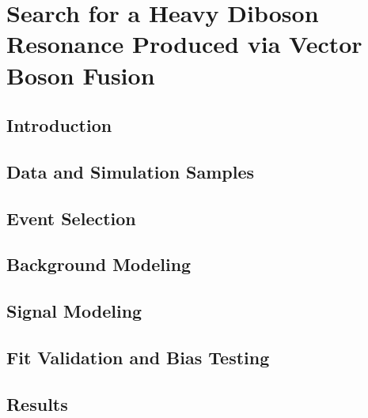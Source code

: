 
\chapter{Search for a Heavy Diboson Resonance Produced via Vector Boson Fusion}

\section{Introduction}

\section{Data and Simulation Samples}

\section{Event Selection}

\section{Background Modeling}

\section{Signal Modeling}

\section{Fit Validation and Bias Testing}

\section{Results}
